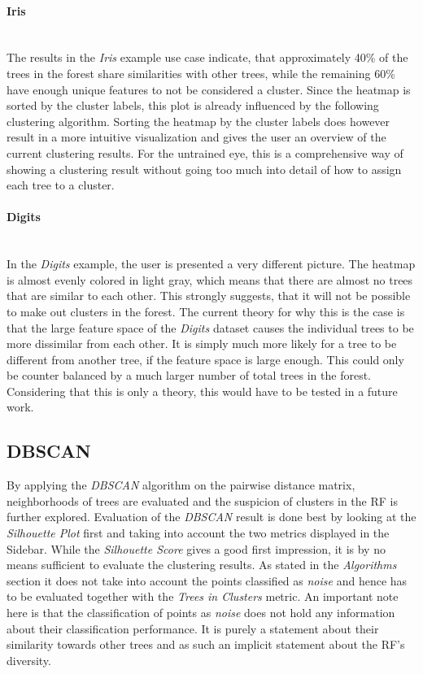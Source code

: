 \documentclass[a4paper, 12pt]{article}
\begin{document}
\paragraph{Iris}\mbox{}\\
The results in the \textit{Iris} example use case indicate, that approximately 40\% of the trees in the
forest share similarities with other trees, while the remaining 60\% have enough unique features to not be
considered a cluster. Since the heatmap is sorted by the cluster labels, this plot is already influenced by
the following clustering algorithm. Sorting the heatmap by the cluster labels does however result in a more
intuitive visualization and gives the user an overview of the current clustering results. For the untrained
eye, this is a comprehensive way of showing a clustering result without going too much into detail of how
to assign each tree to a cluster. \par

\paragraph{Digits}\mbox{}\\
In the \textit{Digits} example, the user is presented a very different picture. The heatmap is almost evenly
colored in light gray, which means that there are almost no trees that are similar to each other. This
strongly suggests, that it will not be possible to make out clusters in the forest. The current theory for
why this is the case is that the large feature space of the \textit{Digits} dataset causes the individual
trees to be more dissimilar from each other. It is simply much more likely for a tree to be different from
another tree, if the feature space is large enough. This could only be counter balanced by a much larger
number of total trees in the forest. Considering that this is only a theory, this would have to be tested
in a future work.

\subsection{DBSCAN}
By applying the \textit{DBSCAN} algorithm on the pairwise distance matrix, neighborhoods of trees are evaluated
and the suspicion of clusters in the RF is further explored. Evaluation of the \textit{DBSCAN} result is done
best by looking at the \textit{Silhouette Plot} first and taking into account the two metrics displayed in the
Sidebar. While the \textit{Silhouette Score} gives a good first impression, it is by no means sufficient to
evaluate the clustering results. As stated in the \textit{Algorithms} section it does not take into account the
points classified as \textit{noise} and hence has to be evaluated together with the \textit{Trees in Clusters}
metric. An important note here is that the classification of points as \textit{noise} does not hold any information about
their classification performance. It is purely a statement about their similarity towards other trees and as such
an implicit statement about the RF's diversity. \par
\end{document}
